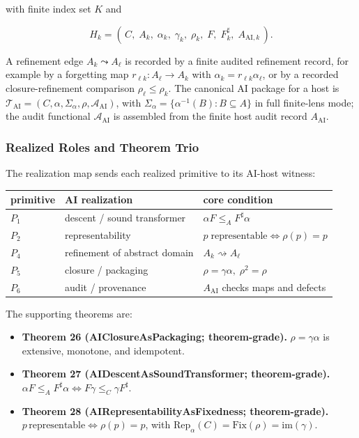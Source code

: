 \documentclass[11pt]{article}
\providecommand{\tightlist}{}
\theoremstyle{definition}
\begin{document}
with finite index set \(K\) and

\[
H_k=(\,C,\;A_k,\;\alpha_k,\;\gamma_k,\;\rho_k,\;F,\;F_k^{\sharp},\;A_{\mathrm{AI},k}\,).
\]

A refinement edge \(A_k\leadsto A_\ell\) is recorded by a finite audited refinement record, for example by a forgetting map \(r_{\ell k}:A_\ell\to A_k\) with \(\alpha_k=r_{\ell k}\alpha_\ell\), or by a recorded closure-refinement comparison \(\rho_\ell\le\rho_k\). The canonical AI package for a host is \(\mathcal T_{\mathrm{AI}}=(C,\alpha,\Sigma_\alpha,\rho,\mathcal A_{\mathrm{AI}})\), with \(\Sigma_\alpha=\{\alpha^{-1}(B):B\subseteq A\}\) in full finite-lens mode; the audit functional \(\mathcal A_{\mathrm{AI}}\) is assembled from the finite host audit record \(A_{\mathrm{AI}}\).

\subsubsection{Realized Roles and Theorem Trio}

The realization map sends each realized primitive to its AI-host witness:

\begin{longtable}[]{@{}lll@{}}
\toprule
primitive & AI realization & core condition\tabularnewline
\midrule
\endhead
\(P_{1}\) & descent / sound transformer & \(\alpha F\le_{A}F^{\sharp}\alpha\)\tabularnewline
\(P_{2}\) & representability & \(p\;\text{representable}\iff\rho(p)=p\)\tabularnewline
\(P_{4}\) & refinement of abstract domain & \(A_{k}\rightsquigarrow A_{\ell}\)\tabularnewline
\(P_{5}\) & closure / packaging & \(\rho=\gamma\alpha,\;\rho^{2}=\rho\)\tabularnewline
\(P_{6}\) & audit / provenance & \(A_{\mathrm{AI}}\) checks maps and defects\tabularnewline
\bottomrule
\end{longtable}

The supporting theorems are:

\begin{itemize}
\tightlist
\item
  \textbf{Theorem 26 (AIClosureAsPackaging; theorem-grade).} \(\rho=\gamma\alpha\) is extensive, monotone, and idempotent.
\item
  \textbf{Theorem 27 (AIDescentAsSoundTransformer; theorem-grade).} \(\alpha F\le_{A}F^{\sharp}\alpha\iff F\gamma\le_{C}\gamma F^{\sharp}\).
\item
  \textbf{Theorem 28 (AIRepresentabilityAsFixedness; theorem-grade).} \(p\,\text{representable}\iff\rho(p)=p\), with \(\mathrm{Rep}_{\alpha}(C)=\mathrm{Fix}(\rho)=\mathrm{im}(\gamma)\).
\end{itemize}
\end{document}
